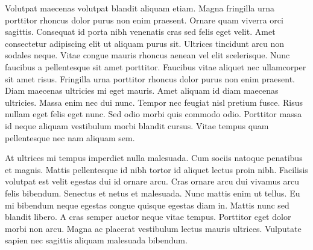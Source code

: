 Volutpat maecenas volutpat blandit aliquam etiam. Magna fringilla urna porttitor rhoncus dolor purus non enim praesent. Ornare quam viverra orci sagittis. Consequat id porta nibh venenatis cras sed felis eget velit. Amet consectetur adipiscing elit ut aliquam purus sit. Ultrices tincidunt arcu non sodales neque. Vitae congue mauris rhoncus aenean vel elit scelerisque. Nunc faucibus a pellentesque sit amet porttitor. Faucibus vitae aliquet nec ullamcorper sit amet risus. Fringilla urna porttitor rhoncus dolor purus non enim praesent. Diam maecenas ultricies mi eget mauris. Amet aliquam id diam maecenas ultricies. Massa enim nec dui nunc. Tempor nec feugiat nisl pretium fusce. Risus nullam eget felis eget nunc. Sed odio morbi quis commodo odio. Porttitor massa id neque aliquam vestibulum morbi blandit cursus. Vitae tempus quam pellentesque nec nam aliquam sem.

At ultrices mi tempus imperdiet nulla malesuada. Cum sociis natoque penatibus et magnis. Mattis pellentesque id nibh tortor id aliquet lectus proin nibh. Facilisis volutpat est velit egestas dui id ornare arcu. Cras ornare arcu dui vivamus arcu felis bibendum. Senectus et netus et malesuada. Nunc mattis enim ut tellus. Eu mi bibendum neque egestas congue quisque egestas diam in. Mattis nunc sed blandit libero. A cras semper auctor neque vitae tempus. Porttitor eget dolor morbi non arcu. Magna ac placerat vestibulum lectus mauris ultrices. Vulputate sapien nec sagittis aliquam malesuada bibendum.